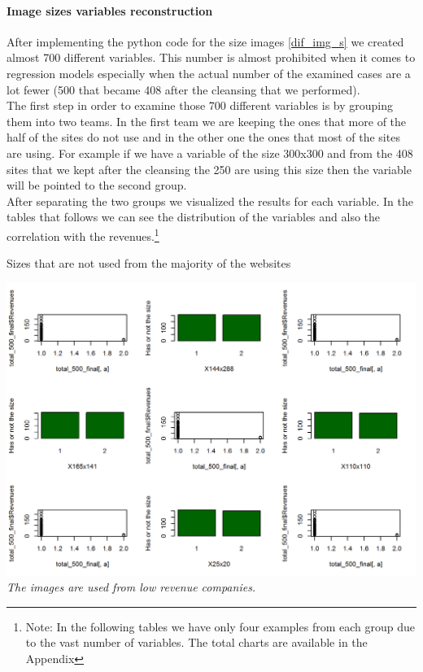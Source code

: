 \documentclass{article}
\begin{document}
\paragraph{Image sizes variables reconstruction}
After implementing the python code for the size images \ref{dif_img_s} we created almost 700 different variables. This number is almost prohibited when it comes to regression models especially when the actual number of the examined cases are a lot fewer (500 that became 408 after the cleansing that we performed).\\
The first step in order to examine those 700 different variables is by grouping them into two teams. In the first team we are keeping the ones that more of the half of the sites do not use and in the other one the ones that most of the sites are using. For example if we have a variable of the size 300x300 and from the 408 sites that we kept after the cleansing the 250 are using this size then the variable will be pointed to the second group.\\
After separating the two groups we visualized the results for each variable. In the tables that follows we can see the distribution of the variables and also the correlation with the revenues.\footnote{Note: In the following tables we have only four examples from each group due to the vast number of variables. The total charts are available in the Appendix}
\begin{table}[H]
\centering
\caption{Sizes that are not used from the majority of the websites}
\begin{center}
\includegraphics[scale=0.5]{../R/photos/64_size_no.png}    \\
\textit{The images are used from low revenue companies.}
\end{center}
\end{table}
\end{document}
